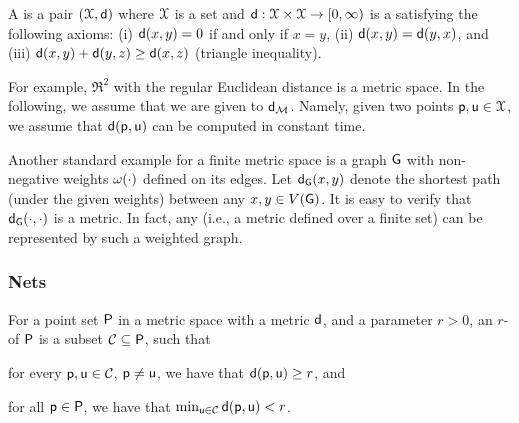 
\begin{defn}
    A  is a pair $(\FMS, \DistChar)$ where $\FMS$
    is a set and $\DistChar: \FMS \times \FMS \rightarrow [0, \infty)$
    is a  satisfying the following axioms: (i)
    $\DistMtr{x}{y} = 0$ if and only if $x =y$, (ii)
    $\DistMtr{x}{y}=\DistMtr{y}{x}$, and (iii)
    $\DistMtr{x}{y} + \DistMtr{y}{z} \geq \DistMtr{x}{ z}$ (triangle
    inequality).
\end{defn}

For example, $\Re^2$ with the regular Euclidean distance is a metric
space. In the following, we assume that we are given  to $\mathsf{d}_{\mathcal{M}}$. Namely, given two points
$\pnt, \pntA \in \FMS$, we assume that $\DistMtr{\pnt}{ \pntA}$ can be
computed in constant time.

Another standard example for a finite metric space is a graph $\mathsf{G}$
with non-negative weights $\WeightX{\cdot}$ defined on its edges.  Let
$\distG{x}{y}$ denote the shortest path (under the given weights)
between any $x,y \in \VerticesX{\Graph}$. It is easy to verify that
$\distG{\cdot}{\cdot}$ is a metric.  In fact, any  (i.e., a metric defined over a finite set) can be
represented by such a weighted graph.

\subsubsection{Nets}

\begin{definition}%
    For a point set ${\mathsf{P}}$ in a metric space with a metric
    $\mathsf{d}$, and a parameter $r>0$, an $r$- of
    ${\mathsf{P}}$ is a subset $\mathcal{C} \subseteq {\mathsf{P}}$, such that
    \begin{compactenumi}
        \item for every $\mathsf{p}, \mathsf{u} \in \mathcal{C}$, $\mathsf{p} \neq \mathsf{u}$, we
        have that $\DistMtr{\pnt}{\pntA} \geq r$, and
        \item for all $\mathsf{p}\in {\mathsf{P}}$, we have that
        $\min_{\pntA\in \cset} \DistMtr{\pnt}{\pntA} < r$.
    \end{compactenumi}
\end{definition}

